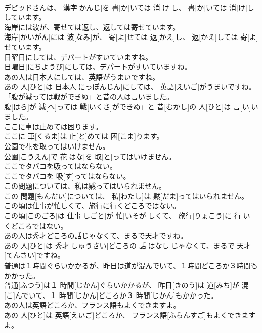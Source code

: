 \documentclass[8pt]{extreport}
\begin{document}
\begin{CJK}{UTF8}{min}
\\	デビッドさんは、 漢字[かんじ]を 書[か]いては 消[け]し、 書[か]いては 消[け]ししています。	
\\	海岸には波が、寄せては返し、返しては寄せています。	
\\	海岸[かいがん]には 波[なみ]が、 寄[よ]せては 返[かえ]し、 返[かえ]しては 寄[よ]せています。	
\\	日曜日にしては、デパートがすいていますね。	
\\	日曜日[にちようび]にしては、デパートがすいていますね。	
\\	あの人は日本人にしては、英語がうまいですね。	
\\	あの 人[ひと]は 日本人[にっぽんじん]にしては、 英語[えいご]がうまいですね。	
\\	「腹が減っては戦ができぬ」と昔の人は言いました。	
\\	腹[はら]が 減[へ]っては 戦[いくさ]ができぬ」と 昔[むかし]の 人[ひと]は 言[い]いました。	
\\	ここに車は止めては困ります。	
\\	ここに 車[くるま]は 止[と]めては 困[こま]ります。	
\\	公園で花を取ってはいけません。	
\\	公園[こうえん]で 花[はな]を 取[と]ってはいけません。	
\\	ここでタバコを吸ってはならない。	
\\	ここでタバコを 吸[す]ってはならない。	
\\	この問題については、私は黙ってはいられません。	
\\	この 問題[もんだい]については、 私[わたし]は 黙[だま]ってはいられません。	
\\	この頃は仕事が忙しくて、旅行に行くどころではない。	
\\	この頃[このごろ]は 仕事[しごと]が 忙[いそが]しくて、 旅行[りょこう]に 行[い]くどころではない。	
\\	あの人は秀才どころの話じゃなくて、まるで天才ですね。	
\\	あの 人[ひと]は 秀才[しゅうさい]どころの 話[はなし]じゃなくて、まるで 天才[てんさい]ですね。	
\\	普通は１時間ぐらいかかるが、昨日は道が混んでいて、１時間どころか３時間もかかった。	
\\	普通[ふつう]は１ 時間[じかん]ぐらいかかるが、 昨日[きのう]は 道[みち]が 混[こ]んでいて、１ 時間[じかん]どころか３ 時間[じかん]もかかった。	
\\	あの人は英語どころか、フランス語もよくできますよ。	
\\	あの 人[ひと]は 英語[えいご]どころか、 フランス語[ふらんすご]もよくできますよ。	

\end{CJK}
\end{document}
